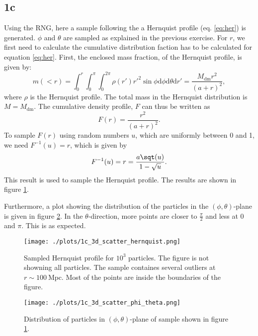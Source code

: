 \subsection*{1c}
Using the RNG, here a sample following the a Hernquist profile (eq. \ref{eq:her}) is generated. $\phi$ and $\theta$ are sampled as explained in the previous exercise. For $r$, we first need to calculate the cumulative distribution faction has to be calculated for equation \ref{eq:her}. First, the enclosed mass fraction, of the Hernquist profile, is given by:
\begin{equation}
  m(<r) = \int_0^r \int_0^\pi \int_0^{2\pi} \rho(r') r'^2 \sin\phi \mathrm{d}\phi\mathrm{d}\theta\mathrm{d}r'=\frac{M_\mathrm{dm}r^2}{\left(a+r\right)^2},
\end{equation}
where $\rho$ is the Hernquist profile. The total mass in the Hernquist distribution is $M = M_\mathrm{dm}$. The cumulative density profile, $F$ can thus be written as
\begin{equation}
  F(r) = \frac{r^2}{\left(a+r\right)^2}.
\end{equation}
To sample $F(r)$ using random numbers $u$, which are uniformly between 0 and 1, we need $F^{-1}(u) = r$, which is given by
\begin{equation}
  F^{-1}(u) = r = \frac{a\sqt(u)}{1-\sqrt{u}}.
\end{equation}
This result is used to sample the Hernquist profile. The results are shown in figure \ref{fig:1c1}.

Furthermore, a plot showing the distribution of the particles in the $(\phi,\theta)$-plane is given in figure \ref{fig:1c2}. In the $\theta$-direction, more points are closer to $\frac{\pi}{2}$ and less at $0$ and $\pi$. This is as expected.

\begin{figure}[!ht]
  \centering
  \texttt{[image: ./plots/1c\_3d\_scatter\_hernquist.png]}
  \caption{Sampled Hernquist profile for $10^3$ particles. The figure is not showning all particles. The sample containes several outliers at $r \sim 100\ \mathrm{Mpc}$. Most of the points are inside the boundaries of the figure.}
  \label{fig:1c1}
\end{figure}

\begin{figure}[!ht]
  \centering
  \texttt{[image: ./plots/1c\_3d\_scatter\_phi\_theta.png]}
  \caption{Distribution of particles in $(\phi,\theta)$-plane of sample shown in figure \ref{fig:1c1}.}
  \label{fig:1c2}
\end{figure}


